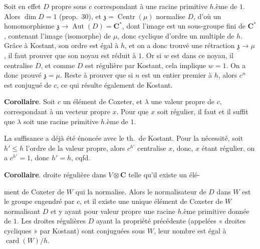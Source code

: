 \documentclass[11pt,a4paper]{article}
\begin{document}
Soit en effet $D$  propre sous $c$ correspondant à une
racine primitive $h$.ème de $1$. Alors $\dim D=1$ (prop.~30), et
$\mathfrak{z}=\operatorname{Centr}(\mu)$ normalise $D$, d'où un homomorphisme
$\mathfrak{z}\to\operatorname{Aut}(D)=\mathbf{C}^{*}$, dont l'image est un
sous-groupe fini de $\mathbf{C}^{*}$, contenant l'image (isomorphe) de $\mu$,
donc cyclique d'ordre un multiple de $h$. Grâce à Kostant, son ordre est égal
à $h$, et on a donc trouvé une rétraction $\mathfrak{z}\to\mu$, il faut
prouver que son noyau est réduit à $1$. Or si $w$ est dans ce noyau, il
 centralise $D$, et comme $D$ est régulière par Kostant, cela
implique $w=1$. On a donc prouvé $\mathfrak{z}=\mu$. Reste à prouver que si
$n$ est un entier premier à $h$, alors $c^{n}$ est conjugué de $c$, ce qui
résulte également de Kostant.

\textbf{Corollaire}. Soit $c$ un élément de Coxeter, et $\lambda$ une valeur
propre de $c$, correspondant à un vecteur propre $x$. Pour que $x$ soit
régulier, il faut et il suffit que $\lambda$ soit une racine primitive
$h$.ème de $1$.

La suffisance a déjà été énoncée avec le th.\ de Kostant. Pour la nécessité,
soit $h'\leqslant h$ l'ordre de la valeur propre, alors $c^{h'}$ centralise
$x$, donc, $x$ étant régulier, on a $c^{h'}=1$, donc $h'=h$, cqfd.

\textbf{Corollaire}.   droite
régulière dans $V\otimes\mathbf{C}$ telle qu'il existe un élé-

ment de Coxeter  de $W$ qui la normalise. Alors le normalisateur de
$D$ dans $W$ est le groupe engendré par $c$, et il existe une unique élément
de Coxeter de $W$ normalisant $D$ et y ayant pour valeur propre une racine
$h$.ème primitive donnée de $1$. Les droites régulières $D$ ayant la propriété
précédente (appelées « droites cycliques » par Kostant) sont conjuguées sous
$W$, leur nombre est égal à $\operatorname{card}(W)/h$.
\end{document}
